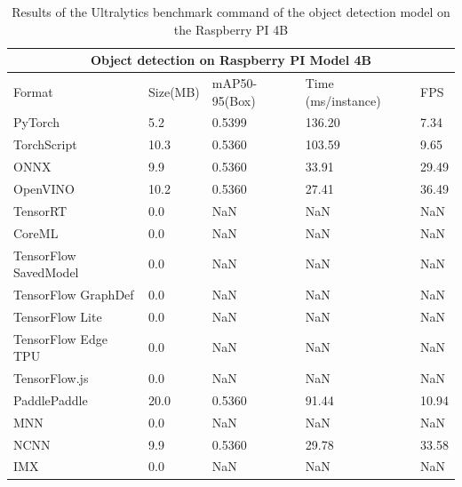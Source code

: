\documentclass[12pt]{article}
\begin{document}
\begin{table}[H]
  \centering
  \begin{tabular}{ |p{3cm}|p{2cm}|p{2cm}|p{3cm}|p{2cm}|  }
    \hline
    \multicolumn{5}{|c|}{Object detection on Raspberry PI Model 4B} \\
    \hline
    Format& Size(MB) &mAP50-95(Box) &Time (ms/instance) &FPS\\
    \hline
    PyTorch&5.2&0.5399&136.20&7.34 \\
    TorchScript&10.3&0.5360&103.59&9.65 \\
    ONNX&9.9&0.5360&33.91&29.49 \\
    OpenVINO&10.2&0.5360&27.41&36.49 \\
    TensorRT&0.0&NaN&NaN&NaN \\
    CoreML&0.0&NaN&NaN&NaN \\
    TensorFlow SavedModel&0.0&NaN&NaN&NaN \\
    TensorFlow GraphDef&0.0&NaN&NaN&NaN \\
    TensorFlow Lite&0.0&NaN&NaN&NaN \\
    TensorFlow Edge TPU&0.0&NaN&NaN&NaN \\
    TensorFlow.js&0.0&NaN&NaN&NaN \\
    PaddlePaddle&20.0&0.5360&91.44&10.94 \\
    MNN&0.0&NaN&NaN&NaN \\
    NCNN&9.9&0.5360&29.78&33.58 \\
    IMX&0.0&NaN&NaN&NaN \\
    \hline
  \end{tabular}
  \caption{Results of the Ultralytics benchmark command of the object detection model on the Raspberry PI 4B}
  \label{table:odrpi}
\end{table}
\end{document}
